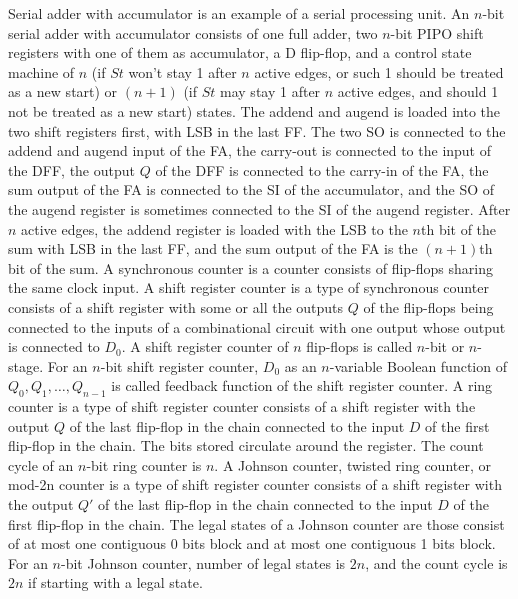 \documentclass[a4paper,12pt]{report}
\begin{document}
Serial adder with accumulator is an example of a serial processing unit. An $n$-bit serial adder with accumulator consists of one full adder, two $n$-bit PIPO shift registers with one of them as accumulator, a D flip-flop, and a control state machine of $n$ (if $St$ won't stay 1 after $n$ active edges, or such 1 should be treated as a new start) or $(n+1)$ (if $St$ may stay 1 after $n$ active edges, and should 1 not be treated as a new start) states. The addend and augend is loaded into the two shift registers first, with LSB in the last FF. The two SO is connected to the addend and augend input of the FA, the carry-out is connected to the input of the DFF, the output $Q$ of the DFF is connected to the carry-in of the FA, the sum output of the FA is connected to the SI of the accumulator, and the SO of the augend register is sometimes connected to the SI of the augend register. After $n$ active edges, the addend register is loaded with the LSB to the $n$th bit of the sum with LSB in the last FF, and the sum output of the FA is the $(n+1)$th bit of the sum.
A synchronous counter is a counter consists of flip-flops sharing the same clock input.
A shift register counter is a type of synchronous counter consists of a shift register with some or all the outputs $Q$ of the flip-flops being connected to the inputs of a combinational circuit with one output whose output is connected to $D_0$. A shift register counter of $n$ flip-flops is called $n$-bit or $n$-stage. For an $n$-bit shift register counter, $D_0$ as an $n$-variable Boolean function of $Q_0,Q_1,\ldots,Q_{n-1}$ is called feedback function of the shift register counter.
A ring counter is a type of shift register counter consists of a shift register with the output $Q$ of the last flip-flop in the chain connected to the input $D$ of the first flip-flop in the chain. The bits stored circulate around the register. The count cycle of an $n$-bit ring counter is $n$.
A Johnson counter, twisted ring counter, or mod-2n counter is a type of shift register counter consists of a shift register with the output $Q'$ of the last flip-flop in the chain connected to the input $D$ of the first flip-flop in the chain. The legal states of a Johnson counter are those consist of at most one contiguous 0 bits block and at most one contiguous 1 bits block. For an $n$-bit Johnson counter,  number of legal states is $2n$, and the count cycle is $2n$ if starting with a legal state.
\end{document}
